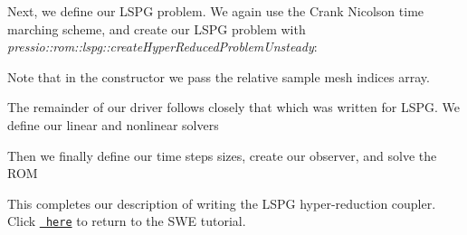 Next, we define our L\+S\+PG problem. We again use the Crank Nicolson time marching scheme, and create our L\+S\+PG problem with {\itshape pressio\+::rom\+::lspg\+::create\+Hyper\+Reduced\+Problem\+Unsteady}\+: 
\begin{DoxyCode}{0}
\end{DoxyCode}


Note that in the constructor we pass the relative sample mesh indices array.

The remainder of our driver follows closely that which was written for L\+S\+PG. We define our linear and nonlinear solvers 
\begin{DoxyCode}{0}
\end{DoxyCode}


Then we finally define our time steps sizes, create our observer, and solve the R\+OM 
\begin{DoxyCode}{0}
\end{DoxyCode}


This completes our description of writing the L\+S\+PG hyper-\/reduction coupler. Click \href{./md_pages_tutorials_tutorial3.html}{\texttt{ here}} to return to the S\+WE tutorial. 